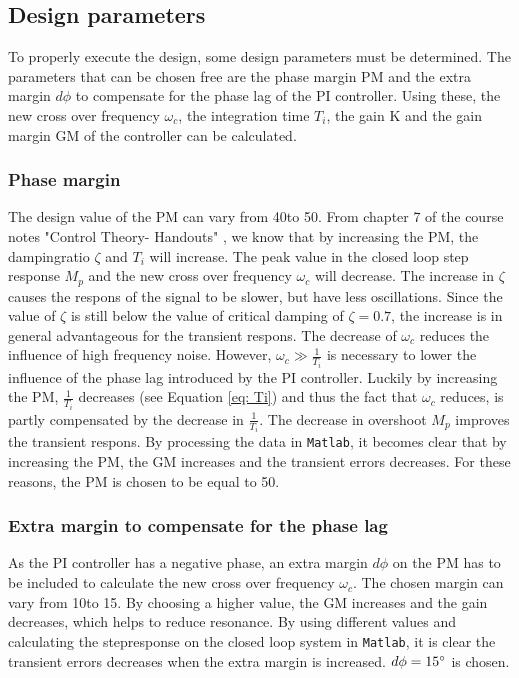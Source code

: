 \documentclass[a4paper,kul]{kulakarticle} %
\begin{document}
\subsection{Design parameters}
To properly execute the design, some design parameters must be determined. The parameters that can be chosen free are the phase margin PM and the extra margin $d\phi$ to compensate for the phase lag of the PI controller. Using these, the new cross over frequency $\omega_c$, the integration time $T_i$, the gain K and the gain margin GM of the controller can be calculated. 



\subsubsection{Phase margin}
The design value of the PM can vary from 40\degree to 50\degree. From chapter 7 of the course notes "Control Theory- Handouts" \cite{slidescontroltheory}, we know that by increasing the PM, the dampingratio $\zeta$ and $T_i$ will increase. The peak value in the closed loop step response $M_p$ and the new cross over frequency $\omega_c$ will decrease. The increase in $\zeta$ causes the respons of the signal to be slower, but have less oscillations. Since the value of $\zeta$ is still below the value of critical damping of $\zeta = 0.7$, the increase is in general advantageous for the transient respons. The decrease of $\omega_c$ %
 reduces the influence of high frequency noise. However, $\omega_c \gg \frac{1}{T_i}$ is necessary to lower the influence of the phase lag introduced by the PI controller. Luckily by increasing the PM, $\frac{1}{T_i}$ decreases (see Equation \ref{eq: Ti}) and thus the fact that $\omega_c$ reduces, is partly compensated by the decrease in $\frac{1}{T_i}$. The decrease in overshoot $M_p$ improves the transient respons. By processing the data in \texttt{Matlab}, it becomes clear that by increasing the PM, the GM increases and the transient errors decreases. For these reasons, the PM is chosen to be equal to 50\degree. 

\subsubsection{Extra margin to compensate for the phase lag}
	As the PI controller has a negative phase, an extra margin $d\phi$ on the PM has to be included to calculate the new cross over frequency $\omega_c$. The chosen margin can vary from 10\degree to 15\degree. By choosing a higher value, the GM increases and the gain decreases, which helps to reduce resonance. By using different values and calculating the stepresponse on the closed loop system in \texttt{Matlab}, it is clear the transient errors decreases when the extra margin is increased. $d\phi = 15\degree$ is chosen. 
\end{document}
